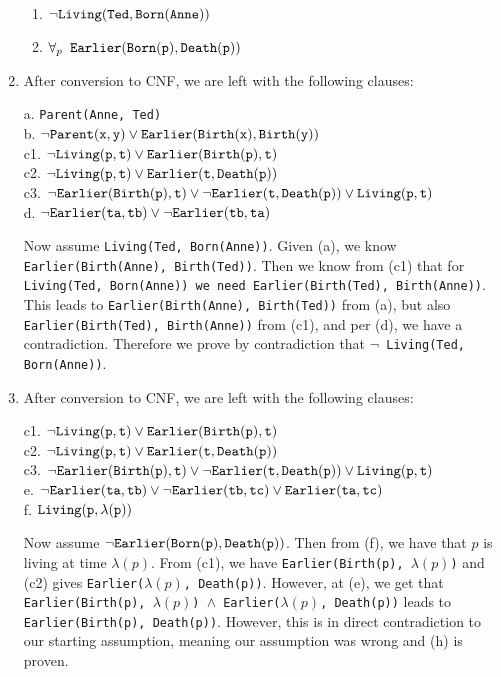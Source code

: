 \documentclass{article}
\begin{document}
\begin{enumerate}
\begin{enumerate}
				\item ${\tt \neg Living(Ted, Born(Anne))}$
				
				\item $\forall_p \phantom{a} {\tt Earlier(Born(p), Death(p))}$
				 
			\end{enumerate}
		
		\item After conversion to CNF, we are left with the following clauses:
		
		a.\phantom{1} {\tt Parent(Anne, Ted)}\\
		b.\phantom{1} ${\tt \neg Parent(x,y) \vee Earlier(Birth(x), Birth(y))}$\\
		c1. ${\tt \neg Living(p,t) \vee Earlier(Birth(p), t)}$\\
		c2. ${\tt \neg Living(p,t) \vee Earlier(t, Death(p))}$\\
		c3. ${\tt \neg Earlier(Birth(p),t) \vee \neg Earlier(t, Death(p)) \vee Living(p,t)}$\\
		d.\phantom{1} ${\tt \neg Earlier(ta, tb) \vee \neg Earlier(tb, ta)}$
		
		Now assume {\tt Living(Ted, Born(Anne))}.  Given (a), we know {\tt Earlier(Birth(Anne), Birth(Ted))}.  Then we know from (c1) that for {\tt Living(Ted, Born(Anne)) we need Earlier(Birth(Ted), Birth(Anne))}.\\  This leads to {\tt Earlier(Birth(Anne), Birth(Ted))} from (a), but also {\tt Earlier(Birth(Ted), Birth(Anne))} from (c1), and per (d), we have a contradiction.  Therefore we prove by contradiction that {\tt $\neg$ Living(Ted, Born(Anne))}.
		
		\item After conversion to CNF, we are left with the following clauses:
		
		c1. ${\tt \neg Living(p,t) \vee Earlier(Birth(p), t)}$\\
		c2. ${\tt \neg Living(p,t) \vee Earlier(t, Death(p))}$\\
		c3. ${\tt \neg Earlier(Birth(p),t) \vee \neg Earlier(t, Death(p)) \vee Living(p,t)}$\\
		e.\phantom{1} ${\tt \neg Earlier(ta, tb) \vee \neg Earlier(tb, tc) \vee Earlier(ta, tc)}$\\
		f.\phantom{1} ${\tt Living(p, \lambda(p))}$
		
		Now assume ${\tt \neg Earlier(Born(p), Death(p))}$.  Then from (f), we have that $p$ is living at time $\lambda(p)$.  From (c1), we have {\tt Earlier(Birth(p), $\lambda(p)$)} and (c2) gives {\tt Earlier($\lambda(p)$, Death(p))}.  However, at (e), we get that {\tt Earlier(Birth(p), $\lambda(p)$) $\wedge$ Earlier($\lambda(p)$, Death(p))} leads to {\tt Earlier(Birth(p), Death(p))}.  However, this is in direct contradiction to our starting assumption, meaning our assumption was wrong and (h) is proven.
		 
	\end{enumerate}
\end{document}
